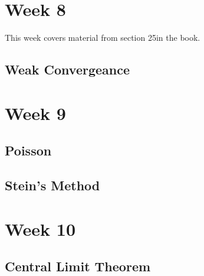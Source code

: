 \documentclass[12pt]{article}
\begin{document}
\section{Week 8}
This week covers material from section 25in the book.

\subsection{Weak Convergeance}


\section{Week 9}

\subsection{Poisson}

\subsection{Stein's Method}


\section{Week 10}

\subsection{Central Limit Theorem}


\newpage
\begin{thebibliography}{99}

\end{thebibliography}
\end{document}
